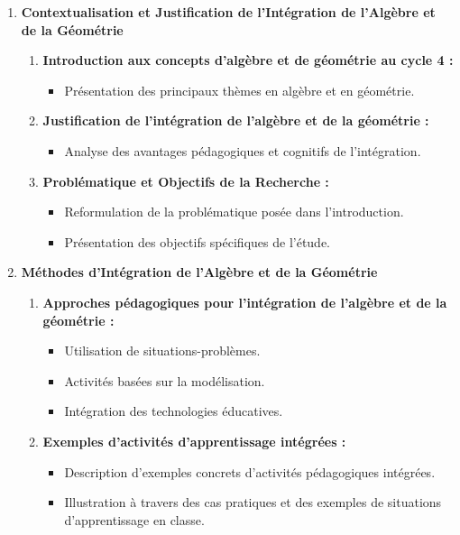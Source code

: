 \begin{enumerate}
    \item \textbf{Contextualisation et Justification de l'Intégration de l'Algèbre et de la Géométrie}
    \begin{enumerate}
        \item \textbf{Introduction aux concepts d'algèbre et de géométrie au cycle 4 :}
        \begin{itemize}
            \item Présentation des principaux thèmes en algèbre et en géométrie.
        \end{itemize}
        
        \item \textbf{Justification de l'intégration de l'algèbre et de la géométrie :}
        \begin{itemize}
            \item Analyse des avantages pédagogiques et cognitifs de l'intégration.
        \end{itemize}
        
        \item \textbf{Problématique et Objectifs de la Recherche :}
        \begin{itemize}
            \item Reformulation de la problématique posée dans l'introduction.
            \item Présentation des objectifs spécifiques de l'étude.
        \end{itemize}
    \end{enumerate}
    
    \item \textbf{Méthodes d'Intégration de l'Algèbre et de la Géométrie}
    \begin{enumerate}
        \item \textbf{Approches pédagogiques pour l'intégration de l'algèbre et de la géométrie :}
        \begin{itemize}
            \item Utilisation de situations-problèmes.
            \item Activités basées sur la modélisation.
            \item Intégration des technologies éducatives.
        \end{itemize}
        
        \item \textbf{Exemples d'activités d'apprentissage intégrées :}
        \begin{itemize}
            \item Description d'exemples concrets d'activités pédagogiques intégrées.
            \item Illustration à travers des cas pratiques et des exemples de situations d'apprentissage en classe.
        \end{itemize}
    \end{enumerate}
    

\end{enumerate}
